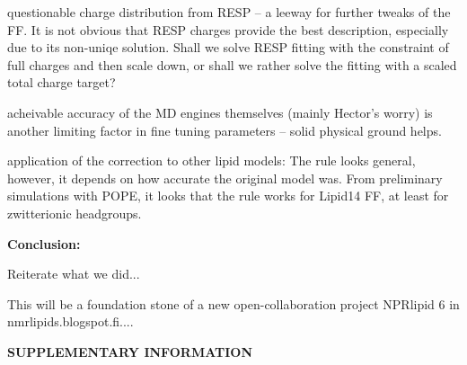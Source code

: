 \documentclass[aip,jcp,twocolumn]{revtex4}
\begin{document}
questionable charge distribution from RESP -- a leeway for further tweaks of the FF.
It is not obvious that RESP charges provide the best description, especially due to its non-uniqe solution. 
Shall we solve RESP fitting with the constraint of full charges and then scale down, or shall we rather solve the fitting with a scaled total charge target?

acheivable accuracy of the MD engines themselves (mainly Hector's worry) is another limiting factor in fine tuning parameters -- solid physical ground helps.

application of the correction to other lipid models: The rule looks general, however, it depends on how accurate the original model was.
From preliminary simulations with POPE, it looks that the rule works for Lipid14 FF, at least for zwitterionic headgroups.

\textbf{Conclusion:}

Reiterate what we did...

This will be a foundation stone of a new open-collaboration project NPRlipid 6 in nmrlipids.blogspot.fi....
















%

\begin{acknowledgments}
\end{acknowledgments}
\newpage
\appendix
\begin{center}
{\bf SUPPLEMENTARY INFORMATION}
\end{center}





\listoftodos
\end{document}
